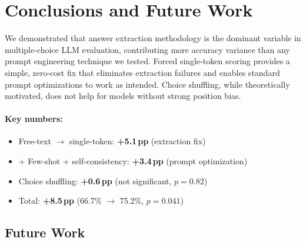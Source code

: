 \documentclass[11pt]{article}
\begin{document}
\section{Conclusions and Future Work}

We demonstrated that answer extraction methodology is the dominant variable in multiple-choice LLM evaluation, contributing more accuracy variance than any prompt engineering technique we tested. Forced single-token scoring provides a simple, zero-cost fix that eliminates extraction failures and enables standard prompt optimizations to work as intended. Choice shuffling, while theoretically motivated, does not help for models without strong position bias.

\paragraph{Key numbers:}
\begin{itemize}
    \item Free-text $\to$ single-token: \textbf{+5.1\,pp} (extraction fix)
    \item + Few-shot + self-consistency: \textbf{+3.4\,pp} (prompt optimization)
    \item Choice shuffling: \textbf{+0.6\,pp} (not significant, $p{=}0.82$)
    \item Total: \textbf{+8.5\,pp} (66.7\% $\to$ 75.2\%, $p = 0.041$)
\end{itemize}

\subsection{Future Work}
\end{document}

